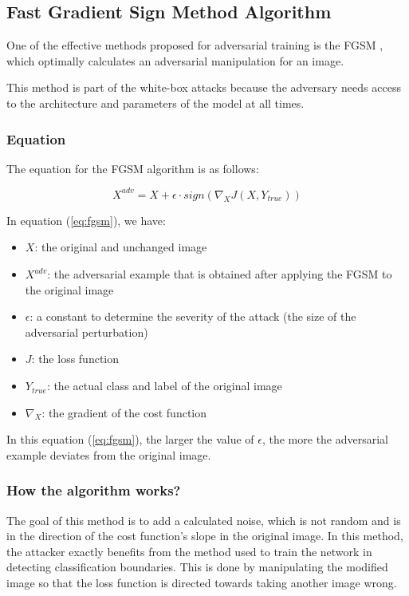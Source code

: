 \documentclass[lettersize,journal]{IEEEtran}
\begin{document}
\subsection*{Fast Gradient Sign Method Algorithm}

One of the effective methods proposed for adversarial training is the FGSM \cite{Goodfellow2015ExplainingAH}, which optimally calculates an adversarial manipulation for an image.

This method is part of the white-box attacks because the adversary needs access to the architecture and parameters of the model at all times.

\subsubsection*{Equation}

The equation for the FGSM algorithm is as follows:

\begin{equation} \label{eq:fgsm}
X^{adv} = X + \epsilon \cdot sign(\nabla_XJ(X, Y_{true}))
\end{equation}

In equation (\ref{eq:fgsm}), we have:
\begin{itemize}
\item $X$: the original and unchanged image
\item $X^{adv}$: the adversarial example that is obtained after applying the FGSM to the original image
\item $\epsilon$: a constant to determine the severity of the attack (the size of the adversarial perturbation)
\item $J$: the loss function
\item $Y_{true}$: the actual class and label of the original image
\item $\nabla_X$: the gradient of the cost function
\end{itemize}
In this equation (\ref{eq:fgsm}), the larger the value of $\epsilon$, the more the adversarial example deviates from the original image.

\subsubsection*{How the algorithm works?}

The goal of this method is to add a calculated noise, which is not random and is in the direction of the cost function's slope in the original image. In this method, the attacker exactly benefits from the method used to train the network in detecting classification boundaries. This is done by manipulating the modified image so that the loss function is directed towards taking another image wrong.
\end{document}
